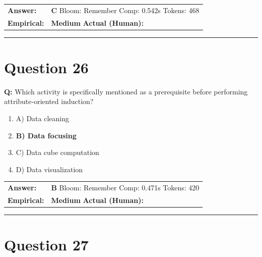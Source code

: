\documentclass[9pt]{article}
\begin{document}
\begin{tabular}{@{}l p{10.5cm}@{}}
\textbf{Answer:} & \textbf{C} \hspace{1em} Bloom: Remember \hspace{1em} Comp: 0.542s \hspace{1em} Tokens: 468 \\
\textbf{Empirical:} & \textbf{Medium} \hspace{1em} \textbf{Actual (Human):} \underline{\hspace{5cm}}
\end{tabular}

\vspace{0.2cm}
\rule{\textwidth}{0.4pt}
\vspace{0.2cm}


\section*{Question 26}

\textbf{Q:} Which activity is specifically mentioned as a prerequisite before performing attribute‑oriented induction?

\begin{enumerate}[label=\textbf{\alph{*})}, nosep]
    \item A) Data cleaning
    \item \textbf{B) Data focusing} %
    \item C) Data cube computation
    \item D) Data visualization

\end{enumerate}

\begin{tabular}{@{}l p{10.5cm}@{}}
\textbf{Answer:} & \textbf{B} \hspace{1em} Bloom: Remember \hspace{1em} Comp: 0.471s \hspace{1em} Tokens: 420 \\
\textbf{Empirical:} & \textbf{Medium} \hspace{1em} \textbf{Actual (Human):} \underline{\hspace{5cm}}
\end{tabular}

\vspace{0.2cm}
\rule{\textwidth}{0.4pt}
\vspace{0.2cm}


\section*{Question 27}
\end{document}
